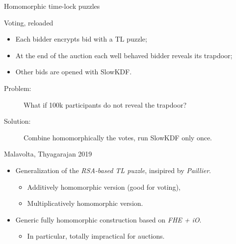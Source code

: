 \documentclass[aspectratio=169]{beamer}
\begin{document}
\begin{frame}{Homomorphic time-lock puzzles}
  \begin{block}{Voting, reloaded}
    \begin{itemize}
    \item Each bidder encrypts bid with a TL puzzle;
    \item At the end of the auction each well behaved bidder reveals
      its trapdoor;
    \item Other bids are opened with SlowKDF.
    \end{itemize}

    \begin{description}
    \item[Problem:] What if 100k participants do not reveal the
      trapdoor?
    \item[Solution:] Combine homomorphically the votes, run SlowKDF
      only once.
    \end{description}
  \end{block}

  \begin{block}{Malavolta, Thyagarajan 2019}
    \begin{itemize}
    \item Generalization of the \emph{RSA-based TL puzzle}, insipired
      by \emph{Paillier}.
      \begin{itemize}
      \item Additively homomorphic version (good for voting),
      \item Multiplicatively homomorphic version.
      \end{itemize}
    \item Generic fully homomorphic construction based on \emph{FHE + iO}.
      \begin{itemize}
      \item In particular, totally impractical for auctions.
      \end{itemize}
    \end{itemize}
  \end{block}
\end{frame}

\end{document}
